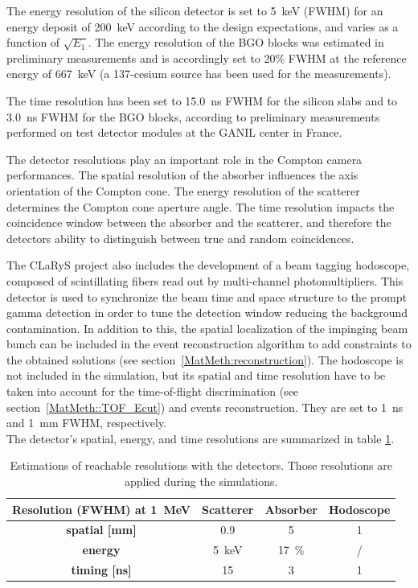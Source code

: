 The energy resolution of the silicon detector is set to 5~keV (FWHM) for an energy deposit of 200~keV according to the design expectations, and varies as a function of $\sqrt{E_{1}}$.
The energy resolution of the BGO blocks was estimated in preliminary measurements and is accordingly set to 20\% FWHM at the reference energy of 667~keV (a 137-cesium source has been used for the measurements). 

The time resolution has been set to 15.0~ns FWHM for the silicon slabs and to 3.0~ns FWHM for the BGO blocks, according to preliminary measurements performed on test detector modules at the GANIL center in France.

The detector resolutions play an important role in the Compton camera performances. The spatial resolution of the absorber influences the axis orientation of the Compton cone. The energy resolution of the scatterer determines the Compton cone aperture angle. The time resolution impacts the coincidence window between the absorber and the scatterer, and therefore the detectors ability to distinguish between true and random coincidences.

The CLaRyS project also includes the development of a beam tagging hodoscope, composed of scintillating fibers read out by multi-channel photomultipliers. This detector is used to synchronize the beam time and space structure to the prompt gamma detection in order to tune the detection window reducing the background contamination. In addition to this, the spatial localization of the impinging beam bunch can be included in the event reconstruction algorithm to add constraints to the obtained solutions (see section~\ref{MatMeth:reconstruction}). The hodoscope is not included in the simulation, but its spatial and time resolution have to be taken into account for the time-of-flight discrimination (see section~\ref{MatMeth::TOF_Ecut}) and events reconstruction. They are set to 1~ns and 1~mm FWHM, respectively.\\ 
The detector's spatial, energy, and time resolutions are summarized in table \ref{table:table_resolution_detecteurs_CC_simulation_Hadronth}.

\begin{table}
\centering
\caption{Estimations of reachable resolutions with the detectors. Those resolutions are applied during the simulations.}
\begin{tabular}{cccc}
\hline
\textbf{Resolution (FWHM) at 1~MeV} & \textbf{Scatterer} & \textbf{Absorber} & \textbf{Hodoscope}\\
\hline 
\textbf{spatial [mm]	}			 &     0.9		 &  5 &	 1\\
\textbf{energy}				&	5~keV		&  17~\%	&	/\\
\textbf{timing [ns]}	        		&	15			&	3 	&  1\\
\hline
\end{tabular}
\label{table:table_resolution_detecteurs_CC_simulation_Hadronth}
\end{table}
    
